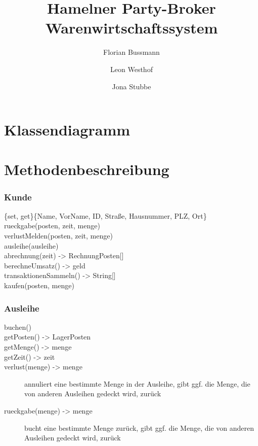 \documentclass[a4paper,12pt]{report}
\title{Hamelner Party-Broker Warenwirtschaftssystem}
\author{Florian Bussmann \and Leon Westhof \and Jona Stubbe}
\begin{document}
\maketitle
\tableofcontents
\part{Klassendiagramm}
\part{Methodenbeschreibung}
\section{Kunde}
\begin{description}
\item[\{set, get\}\{Name, VorName, ID, Straße, Hausnummer, PLZ, Ort\}]
\item[rueckgabe(posten, zeit, menge)]
\item[verlustMelden(posten, zeit, menge)]
\item[ausleihe(ausleihe)]
\item[abrechnung(zeit) -> RechnungPosten{[]}]
\item[berechneUmsatz() -> geld]
\item[transaktionenSammeln() -> String{[]}]
\item[kaufen(posten, menge)]
\end{description}
\section{Ausleihe}
\begin{description}
\item[buchen()]
\item[getPosten() -> LagerPosten]
\item[getMenge() -> menge]
\item[getZeit() -> zeit]
\item[verlust(menge) -> menge]
annuliert eine bestimmte Menge in der Ausleihe, gibt ggf. die Menge, die von anderen Ausleihen gedeckt wird, zurück
\item[rueckgabe(menge) -> menge]
bucht eine bestimmte Menge zurück, gibt ggf. die Menge, die von anderen Ausleihen gedeckt wird, zurück
\end{description}
\end{document}
